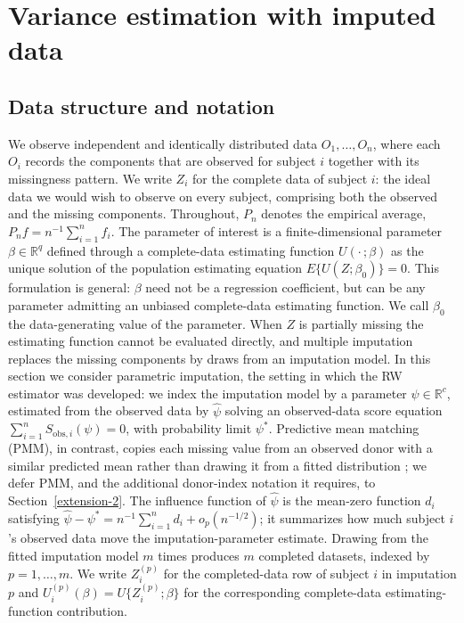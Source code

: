 \section{Variance estimation with imputed data}\label{variance-estimation}
\subsection{Data structure and notation}\label{data-notation}
We observe independent and identically distributed data
\(O_1,\ldots,O_n\), where each \(O_i\) records the components that are
observed for subject \(i\) together with its missingness pattern.  We
write \(Z_i\) for the complete data of subject \(i\): the ideal data we
would wish to observe on every subject, comprising both the observed
and the missing components.  Throughout, \(P_n\) denotes the empirical
average, \(P_n f = n^{-1}\sum_{i=1}^n f_i\).
The parameter of interest is a finite-dimensional parameter
\(\beta\in\mathbb{R}^q\) defined through a complete-data estimating
function \(U(\cdot\,;\beta)\) as the unique solution of the population
estimating equation \(E\{U(Z;\beta_0)\}=0\).  This formulation is
general: \(\beta\) need not be a regression coefficient, but can be any
parameter admitting an unbiased complete-data estimating function.  We
call \(\beta_0\) the data-generating value of the parameter.
When \(Z\) is partially missing the estimating function cannot be
evaluated directly, and multiple imputation replaces the missing
components by draws from an imputation model.  In this section we
consider parametric imputation, the setting in which the RW estimator
was developed: we index the imputation model by a parameter
\(\psi\in\mathbb{R}^c\), estimated from the observed data by
\(\hat\psi\) solving an observed-data score equation
\(\sum_{i=1}^n S_{\mathrm{obs},i}(\psi)=0\), with probability limit
\(\psi^\ast\).  Predictive mean matching (PMM), in contrast, copies
each missing value from an observed donor with a similar predicted
mean rather than drawing it from a fitted distribution
\citep{schenker1995partially, andridge2010review}; we defer PMM, and
the additional donor-index notation it requires, to
Section~\ref{extension-2}.  The influence function of \(\hat\psi\) is
the mean-zero function \(d_i\) satisfying
\(\hat\psi-\psi^\ast = n^{-1}\sum_{i=1}^n d_i + o_p(n^{-1/2})\); it
summarizes how much subject \(i\)'s observed data move the
imputation-parameter estimate.
Drawing from the fitted imputation model \(m\) times produces \(m\)
completed datasets, indexed by \(p=1,\ldots,m\).  We write
\(Z_i^{(p)}\) for the completed-data row of subject \(i\) in imputation
\(p\) and \(U_i^{(p)}(\beta)=U\{Z_i^{(p)};\beta\}\) for the
corresponding complete-data estimating-function contribution.
